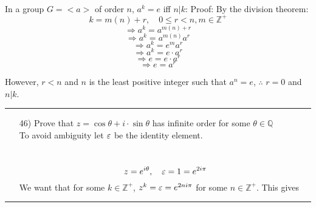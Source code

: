 \documentclass[11pt]{article}
\begin{document}
\begin{solution} \hfill \\
In a group $G=<a>$ of order $n$, $a^k=e$ iff $n|k$:
Proof:
By the division theorem:
$$k = m(n)+r, \quad 0\leq r<n, m\in \mathbb{Z}^+$$
$$\Rightarrow a^k = a^{m(n)+r}$$
$$\Rightarrow a^k = a^{m(n)}a^{r}$$
$$\Rightarrow a^k = e^{m}a^{r}$$
$$\Rightarrow a^k = e\cdot a^{r}$$
$$\Rightarrow e = e\cdot a^{r}$$
$$\Rightarrow e = a^{r}$$

However, $r<n$ and $n$ is the least positive integer such that $a^n=e$, $\therefore$ $r = 0$ and $n|k$.
\end{solution}
\vspace{6pt}
\hrule
\vspace{6pt}

\begin{itemize}
    \item[46)] Prove that $z=\cos\theta + i\cdot \sin\theta$ has infinite order for some $\theta \in \mathbb{Q}$\\
    To avoid ambiguity let $\varepsilon$ be the identity element.
    \begin{solution} \hfill \\
        $$z=e^{i\theta}, \quad \varepsilon=1=e^{2i\pi}$$
        We want that for some $k\in \mathbb{Z}^+$, $z^k=\varepsilon=e^{2ni\pi}$ for some $n\in \mathbb{Z}^+$. This gives 
    \end{solution}
\end{itemize}
\vspace{6pt}
\hrule
\vspace{6pt}
\end{document}
